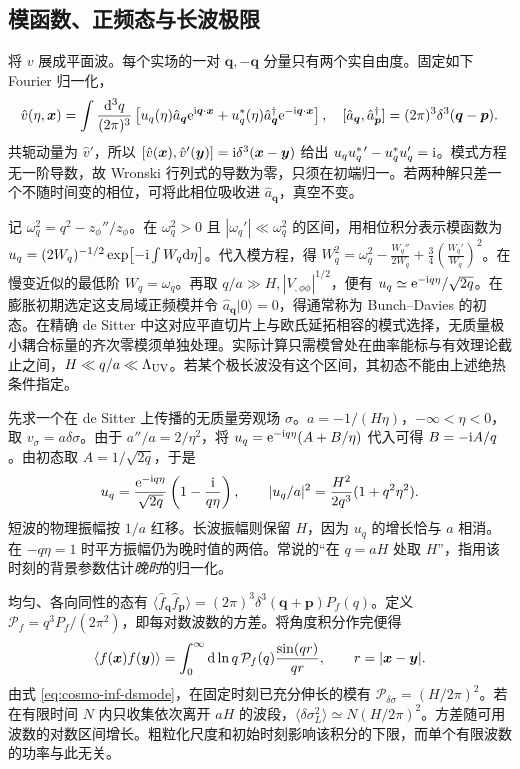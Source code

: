 \subsection{模函数、正频态与长波极限}\label{sec:cosmo-inf-vac}

将 $v$ 展成平面波。每个实场的一对 $\bm q,-\bm q$ 分量只有两个实自由度。固定如下 Fourier 归一化，
\begin{equation}\label{eq:cosmo-inf-quant}
 \hat v(\eta,\bm x)=\int\frac{\dd^3q}{(2\pi)^3}
 \left[u_q(\eta)\hat a_{\bm q}\mathrm{e}^{\mathrm{i}\bm q\cdot\bm x}
 +u_q^*(\eta)\hat a_{\bm q}^\dagger\mathrm{e}^{-\mathrm{i}\bm q\cdot\bm x}\right],
 \quad [\hat a_{\bm q},\hat a^\dagger_{\bm p}]
 =(2\pi)^3\delta^3(\bm q-\bm p).
\end{equation}
共轭动量为 $\hat v'$，所以 $[\hat v(\bm x),\hat v'(\bm y)]=\mathrm{i}\delta^3(\bm x-\bm y)$ 给出 $u_q u_q^{*\,\prime}-u_q^*u_q'=\mathrm{i}$。模式方程无一阶导数，故 Wronski 行列式的导数为零，只须在初端归一。若两种解只差一个不随时间变的相位，可将此相位吸收进 $\hat a_{\bm q}$，真空不变。

记 $\omega_q^2=q^2-z_\phi''/z_\phi$。在 $\omega_q^2>0$ 且 $|\omega_q'|\ll\omega_q^2$ 的区间，用相位积分表示模函数为 $u_q=(2W_q)^{-1/2}\exp\!\left[-\mathrm{i}\int W_q\dd\eta\right]$。代入模方程，得 $W_q^2=\omega_q^2-\frac{W_q''}{2W_q} +\frac34\left(\frac{W_q'}{W_q}\right)^2$。在慢变近似的最低阶 $W_q=\omega_q$。再取 $q/a\gg H,|V_{,\phi\phi}|^{1/2}$，便有 $u_q\simeq\mathrm{e}^{-\mathrm{i} q\eta}/\sqrt{2q}$。在膨胀初期选定这支局域正频模并令 $\hat a_{\bm q}|0\rangle=0$，得通常称为 Bunch--Davies 的初态。在精确 de Sitter 中这对应平直切片上与欧氏延拓相容的模式选择，无质量极小耦合标量的齐次零模须单独处理。实际计算只需模曾处在曲率能标与有效理论截止之间，$H\ll q/a\ll\Lambda_{\rm UV}$。若某个极长波没有这个区间，其初态不能由上述绝热条件指定。

先求一个在 de Sitter 上传播的无质量旁观场 $\sigma$。$a=-1/(H\eta)$，$-\infty<\eta<0$，取 $v_\sigma=a\delta\sigma$。由于 $a''/a=2/\eta^2$，将 $u_q=\mathrm{e}^{-\mathrm{i} q\eta}(A+B/\eta)$ 代入可得 $B=-\mathrm{i} A/q$。由初态取 $A=1/\sqrt{2q}$，于是
\begin{equation}\label{eq:cosmo-inf-dsmode}
 u_q=\frac{\mathrm{e}^{-\mathrm{i} q\eta}}{\sqrt{2q}}\left(1-\frac{\mathrm{i}}{q\eta}\right),
 \qquad
 |u_q/a|^2=\frac{H^2}{2q^3}(1+q^2\eta^2).
\end{equation}
短波的物理振幅按 $1/a$ 红移。长波振幅则保留 $H$，因为 $u_q$ 的增长恰与 $a$ 相消。在 $-q\eta=1$ 时平方振幅仍为晚时值的两倍。常说的“在 $q=aH$ 处取 $H$”，指用该时刻的背景参数估计\emph{晚时}的归一化。

均匀、各向同性的态有 $\langle\hat f_{\bm q}\hat f_{\bm p}\rangle=(2\pi)^3\delta^3(\bm q+\bm p)P_f(q)$。定义 $\mathcal P_f=q^3P_f/(2\pi^2)$，即每对数波数的方差。将角度积分作完便得
\[
 \langle f(\bm x)f(\bm y)\rangle
 =\int_0^\infty \dd\ln q\,\mathcal P_f(q)\frac{\sin(qr)}{qr},
 \qquad r=|\bm x-\bm y| .
\]
由式 \eqref{eq:cosmo-inf-dsmode}，在固定时刻已充分伸长的模有 $\mathcal P_{\delta\sigma}=(H/2\pi)^2$。若在有限时间 $N$ 内只收集依次离开 $aH$ 的波段，$\langle\delta\sigma_L^2\rangle\simeq N(H/2\pi)^2$。方差随可用波数的对数区间增长。粗粒化尺度和初始时刻影响该积分的下限，而单个有限波数的功率与此无关。

